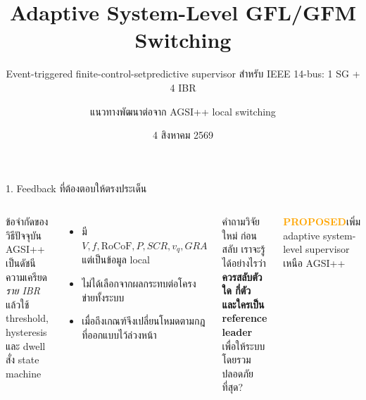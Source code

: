 \documentclass[aspectratio=169,12pt]{beamer}
\title{Adaptive System-Level GFL/GFM Switching}
\subtitle{Event-triggered finite-control-set\newline predictive supervisor\newline
สำหรับ IEEE 14-bus: 1 SG + 4 IBR}
\author{แนวทางพัฒนาต่อจาก AGSI++ local switching}
\date{4 สิงหาคม 2569}
\newcommand{\proposal}{\textcolor{orange}{\textbf{PROPOSED}}}
\begin{document}
\begin{frame}[plain]
  \vspace{1.15cm}
  \hspace{1.4cm}\begin{minipage}{.78\textwidth}
    {\color{white}\inserttitle\par}
    \vspace{.3cm}
    {\color{white}\insertsubtitle\par}
    \vspace{.75cm}
    {\color{white!85}\insertauthor\par\insertdate}
  \end{minipage}
\end{frame}

\begin{frame}{1. Feedback ที่ต้องตอบให้ตรงประเด็น}
\begin{columns}[T,onlytextwidth]
\begin{alertblock}{ข้อจำกัดของวิธีปัจจุบัน}
AGSI++ เป็นดัชนีความเครียด \emph{ราย IBR} แล้วใช้ threshold, hysteresis และ dwell สั่ง state machine
\end{alertblock}
\begin{itemize}
  \item มี $V,f,\mathrm{RoCoF},P,SCR,v_q,GRA$ แต่เป็นข้อมูล local
  \item ไม่ได้เลือกจากผลกระทบต่อโครงข่ายทั้งระบบ
  \item เมื่อถึงเกณฑ์จึงเปลี่ยนโหมดตามกฎที่ออกแบบไว้ล่วงหน้า
\end{itemize}
\begin{block}{คำถามวิจัยใหม่}
ก่อนสลับ เราจะรู้ได้อย่างไรว่า \textbf{ควรสลับตัวใด กี่ตัว และใครเป็น reference leader} เพื่อให้ระบบโดยรวมปลอดภัยที่สุด?
\end{block}
\vspace{.25cm}
\centering
\proposal\quad เพิ่ม adaptive system-level supervisor เหนือ AGSI++
\end{columns}
\end{frame}
\end{document}
